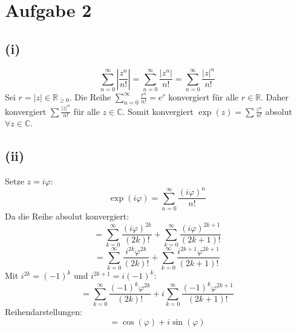 \documentclass{article}
\begin{document}
\section*{Aufgabe 2}

\subsection*{(i)}
\[ \sum_{n=0}^{\infty} \left| \frac{z^n}{n!} \right| = \sum_{n=0}^{\infty} \frac{|z^n|}{n!} = \sum_{n=0}^{\infty} \frac{|z|^n}{n!} \]
Sei $r = |z| \in \mathbb{R}_{\ge 0}$. Die Reihe $\sum_{n=0}^{\infty} \frac{r^n}{n!} = e^r$ konvergiert für alle $r \in \mathbb{R}$.
Daher konvergiert $\sum \frac{|z|^n}{n!}$ für alle $z \in \mathbb{C}$.
Somit konvergiert $\exp(z) = \sum \frac{z^n}{n!}$ absolut $\forall z \in \mathbb{C}$.

\subsection*{(ii)}
Setze $z=i\varphi$:
\[ \exp(i\varphi) = \sum_{n=0}^{\infty} \frac{(i\varphi)^n}{n!} \]
Da die Reihe absolut konvergiert:
\[ = \sum_{k=0}^{\infty} \frac{(i\varphi)^{2k}}{(2k)!} + \sum_{k=0}^{\infty} \frac{(i\varphi)^{2k+1}}{(2k+1)!} \]
\[ = \sum_{k=0}^{\infty} \frac{i^{2k}\varphi^{2k}}{(2k)!} + \sum_{k=0}^{\infty} \frac{i^{2k+1}\varphi^{2k+1}}{(2k+1)!} \]
Mit $i^{2k} = (-1)^k$ und $i^{2k+1} = i(-1)^k$:
\[ = \sum_{k=0}^{\infty} \frac{(-1)^k \varphi^{2k}}{(2k)!} + i \sum_{k=0}^{\infty} \frac{(-1)^k \varphi^{2k+1}}{(2k+1)!} \]
Reihendarstellungen:
\[ = \cos(\varphi) + i \sin(\varphi) \]
\end{document}
